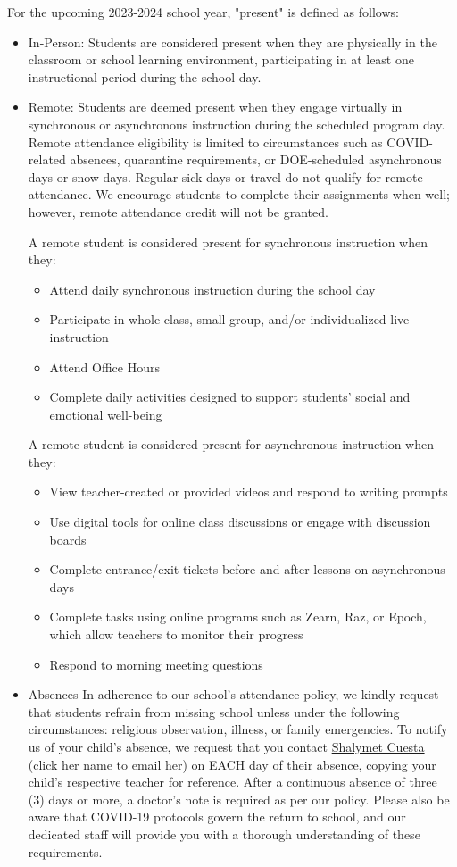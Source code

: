 \documentclass[11pt, letterpaper]{article}
\begin{document}
For the upcoming 2023-2024 school year, "present" is defined as follows:
\begin{itemize}
\item In-Person: Students are considered present when they are physically in the classroom or school learning environment, participating in at least one instructional period during the school day.
\item Remote: Students are deemed present when they engage virtually in synchronous or asynchronous instruction during the scheduled program day. Remote attendance eligibility is limited to circumstances such as COVID-related absences, quarantine requirements, or DOE-scheduled asynchronous days or snow days. Regular sick days or travel do not qualify for remote attendance. We encourage students to complete their assignments when well; however, remote attendance credit will not be granted.

A remote student is considered present for synchronous instruction when they:
	\begin{itemize}
	\item Attend daily synchronous instruction during the school day
	\item Participate in whole-class, small group, and/or individualized live
	instruction
    \item Attend Office Hours
    \item Complete daily activities designed to support students' social and        	emotional
    well-being
	\end{itemize}
	
A remote student is considered present for asynchronous instruction when they:
	\begin{itemize}
	\item View teacher-created or provided videos and respond to writing prompts
	\item Use digital tools for online class discussions or engage with discussion
	boards
    \item Complete entrance/exit tickets before and after lessons on asynchronous days
    \item Complete tasks using online programs such as Zearn, Raz, or Epoch, which
    allow teachers to monitor their progress
    \item Respond to morning meeting questions
	\end{itemize}
\item Absences
In adherence to our school's attendance policy, we kindly request that students refrain from missing school unless under the following circumstances: religious observation, illness, or family emergencies. To notify us of your child's absence, we request that you contact \href{https://www.ps192.org/apps/pages/index.jsp?uREC_ID=1199556&type=u}{Shalymet Cuesta} (click her name to email her) on EACH day of their absence, copying your child's respective teacher for reference. After a continuous absence of three (3) days or more, a doctor's note is required as per our policy. Please also be aware that COVID-19 protocols govern the return to school, and our dedicated staff will provide you with a thorough understanding of these requirements.


\end{itemize}
\end{document}
